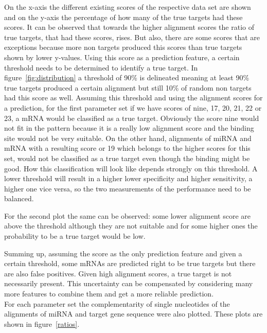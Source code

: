 \documentclass[12pt]{article}
\begin{document}
On the x-axis the different existing scores of the respective data set are shown and on the y-axis the percentage of how many of the true targets had these scores. It can be observed that towards the higher alignment scores the ratio of true targets, that had these scores, rises. But also, there are some scores that are exceptions because more non targets produced this scores than true targets shown by lower y-values. Using this score as a prediction feature, a certain threshold needs to be determined to identify a true target. In figure~\ref{fig:distribution} a threshold of 90\% is delineated meaning at least 90\% true targets produced a certain alignment but still 10\% of random non targets had this score as well. Assuming this threshold and using the alignment scores for a prediction, for the first parameter set if we have scores of nine, 17, 20, 21, 22 or 23, a mRNA would be classified as a true target. Obviously the score nine would not fit in the pattern because it is a really low alignment score and the binding site would not be very suitable. On the other hand, alignments of miRNA and mRNA with a resulting score or 19 which belongs to the higher scores for this set, would not be classified as a true target even though the binding might be good. How this classification will look like depends strongly on this threshold. A lower threshold will result in a higher lower specificity and higher sensitivity, a higher one vice versa, so the two measurements of the performance need to be balanced.

For the second plot the same can be observed: some lower alignment score are above the threshold although they are not suitable and for some higher ones the probability to be a true target would be low.

Summing up, assuming the score as the only prediction feature and given a certain threshold, some mRNAs are predicted right to be true targets but there are also false positives. Given high alignment scores, a true target is not necessarily present. This uncertainty can be compensated by considering many more features to combine them and get a more reliable prediction.\\ 


For each parameter set the complementarity of single nucleotides of the alignments of miRNA and target gene sequence were also plotted. These plots are shown in figure~\ref{ratios}.
\end{document}

